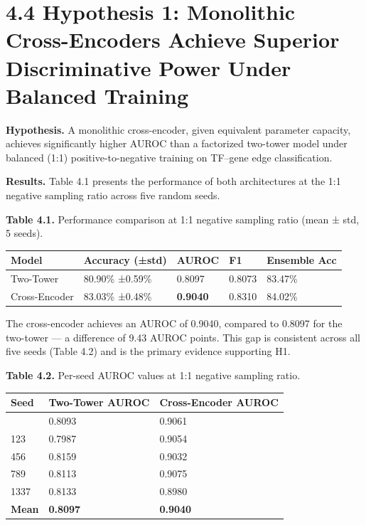 \documentclass[
  12pt,
]{report}
\newcounter{none} %
\begin{document}
\section{4.4 Hypothesis 1: Monolithic Cross-Encoders Achieve Superior
Discriminative Power Under Balanced
Training}\label{hypothesis-1-monolithic-cross-encoders-achieve-superior-discriminative-power-under-balanced-training}

\textbf{Hypothesis.} A monolithic cross-encoder, given equivalent
parameter capacity, achieves significantly higher AUROC than a
factorized two-tower model under balanced (1:1) positive-to-negative
training on TF--gene edge classification.

\textbf{Results.} Table 4.1 presents the performance of both
architectures at the 1:1 negative sampling ratio across five random
seeds.

\textbf{Table 4.1.} Performance comparison at 1:1 negative sampling
ratio (mean ± std, 5 seeds).

{\def\LTcaptype{none} %
\begin{longtable}[]{@{}lllll@{}}
\toprule\noalign{}
Model & Accuracy (±std) & AUROC & F1 & Ensemble Acc \\
\midrule\noalign{}
\endhead
\bottomrule\noalign{}
\endlastfoot
Two-Tower & 80.90\% ±0.59\% & 0.8097 & 0.8073 & 83.47\% \\
Cross-Encoder & 83.03\% ±0.48\% & \textbf{0.9040} & 0.8310 & 84.02\% \\
\end{longtable}
}

The cross-encoder achieves an AUROC of 0.9040, compared to 0.8097 for
the two-tower --- a difference of 9.43 AUROC points. This gap is
consistent across all five seeds (Table 4.2) and is the primary evidence
supporting H1.

\textbf{Table 4.2.} Per-seed AUROC values at 1:1 negative sampling
ratio.

{\def\LTcaptype{none} %
\begin{longtable}[]{@{}lll@{}}
\toprule\noalign{}
Seed & Two-Tower AUROC & Cross-Encoder AUROC \\
\midrule\noalign{}
\endhead
\bottomrule\noalign{}
\endlastfoot
42 & 0.8093 & 0.9061 \\
123 & 0.7987 & 0.9054 \\
456 & 0.8159 & 0.9032 \\
789 & 0.8113 & 0.9075 \\
1337 & 0.8133 & 0.8980 \\
\textbf{Mean} & \textbf{0.8097} & \textbf{0.9040} \\
\end{longtable}
}
\end{document}
